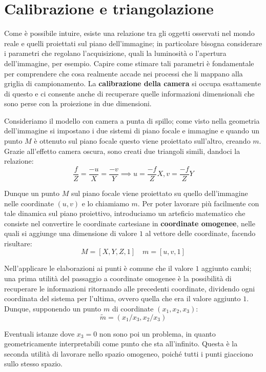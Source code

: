 \section{Calibrazione e triangolazione}
Come è possibile intuire, esiste una relazione tra gli oggetti osservati nel mondo reale e quelli proiettati sul piano dell'immagine; in particolare
bisogna considerare i parametri che regolano l'acquisizione, quali la luminosità o l'apertura dell'immagine, per esempio. Capire come stimare tali
parametri è fondamentale per comprendere che cosa realmente accade nei processi che li mappano alla griglia di campionamento. La \textbf{calibrazione
della camera} si occupa esattamente di questo e ci consente anche di recuperare quelle informazioni dimensionali che sono perse con la proiezione in due
dimensioni.\par
Consideriamo il modello con camera a punta di spillo; come visto nella geometria dell'immagine si impostano i due sistemi di piano focale e immagine e
quando un punto $M$ è ottenuto sul piano focale questo viene proiettato sull'altro, creando $m$. Grazie all'effetto camera oscura, sono creati due
triangoli simili, dandoci la relazione: \[
	\frac{f}{Z} = \frac{-u}{X} = \frac{-v}{Y} \implies u = \frac{-f}{Z}X, v = \frac{-f}{Z}Y
\]

\noindent Dunque un punto $M$ sul piano focale viene proiettato su quello dell'immagine nelle coordinate $(u,v)$ e lo chiamiamo $m$. Per poter lavorare
più facilmente con tale dinamica sul piano proiettivo, introduciamo un arteficio matematico che consiste nel convertire le coordinate cartesiane in
\textbf{coordinate omogenee}, nelle quali si aggiunge una dimensione di valore $1$ al vettore delle coordinate, facendo risultare: \[
	M = [X, Y, Z, 1]\quad m = [u, v, 1]
\]

\noindent Nell'applicare le elaborazioni ai punti è comune che il valore $1$ aggiunto cambi; una prima utilità del passaggio a coordinate omogenee è
la possibilità di recuperare le informazioni ritornando alle precedenti coordinate, dividendo ogni coordinata del sistema per l'ultima, ovvero quella
che era il valore aggiunto $1$. Dunque, supponendo un punto $m$ di coordinate $(x_1, x_2, x_3)$: \[
	\tilde{m} = (x_1/x_3, x_2/x_3)
\]

\noindent Eventuali istanze dove $x_3=0$ non sono poi un problema, in quanto geometricamente interpretabili come punto che sta all'infinito. Questa è
la seconda utilità di lavorare nello spazio omogeneo, poiché tutti i punti giacciono sullo stesso spazio.

